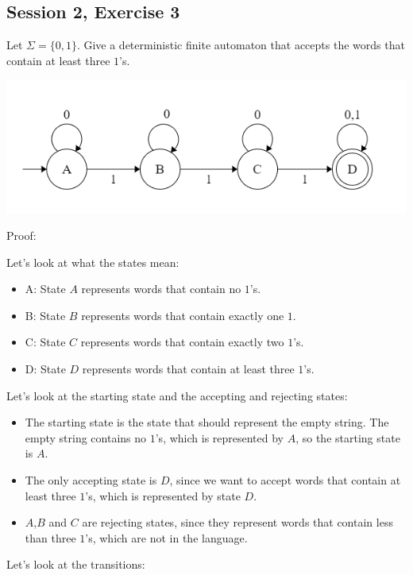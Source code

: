 \subsection{Session 2, Exercise 3}


Let $\Sigma=\{0,1\}$. Give a deterministic finite automaton that accepts the words that contain at least three $1$'s.



\includegraphics[width=0.6\linewidth]{02/2_3.png}

Proof:

Let's look at what the states mean:

\begin{itemize}
    \item A: State $A$ represents words that contain no $1$'s.
    \item B: State $B$ represents words that contain exactly one $1$.
    \item C: State $C$ represents words that contain exactly two  $1$'s.
    \item D: State $D$ represents words that contain at least three  $1$'s.
\end{itemize}

Let's look at the starting state and the accepting and rejecting states:

\begin{itemize}
    \item The starting state is the state that should represent the empty string. The empty string contains no $1$'s, which is represented by $A$, so the starting state is $A$.
    \item The only accepting state is $D$, since we want to accept words that contain at least three $1$'s, which is represented by state $D$.
    \item $A$,$B$ and $C$ are rejecting states, since they represent words that contain less than three $1$'s, which are not in the language.
\end{itemize}

Let's look at the transitions:

